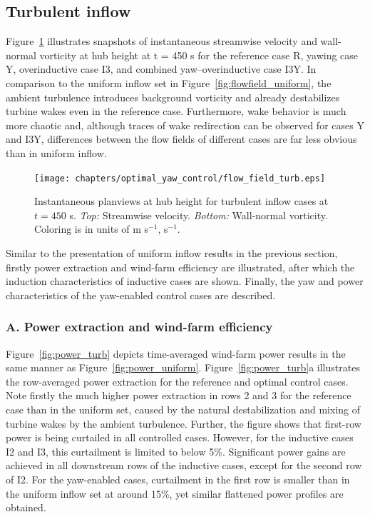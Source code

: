 \subsection{Turbulent inflow}\label{sec:opt_yaw_turb}
	Figure~\ref{fig:flowfield_turb} illustrates snapshots of instantaneous streamwise velocity and wall-normal vorticity at hub height at t = 450 s for the reference case R, yawing case Y, overinductive case I3, and combined yaw--overinductive case I3Y. In comparison to the uniform inflow set in Figure~\ref{fig:flowfield_uniform}, the ambient turbulence introduces background vorticity and already destabilizes turbine wakes even in the reference case. Furthermore, wake behavior is much more chaotic and, although traces of wake redirection can be observed for cases Y and I3Y, differences between the flow fields of different cases are far less obvious than in uniform inflow. 
	\begin{figure}
		\texttt{[image: chapters/optimal\_yaw\_control/flow\_field\_turb.eps]}
		\caption[Instantaneous planviews at hub height for turbulent inflow cases at $t= 450$ s.]{Instantaneous planviews at hub height for turbulent inflow cases at $t= 450$ s. \emph{Top: } Streamwise velocity. \emph{Bottom: } Wall-normal vorticity. Coloring is in units of m s$^{-1}$, s$^{-1}$. \label{fig:flowfield_turb}}
	\end{figure}
	
	Similar to the presentation of uniform inflow results in the previous section, firstly power extraction and wind-farm efficiency are illustrated, after which the induction characteristics of inductive cases are shown. Finally, the yaw and power characteristics of the yaw-enabled control cases are described.
	
	\subsubsection{A. Power extraction and wind-farm efficiency}
	Figure~\ref{fig:power_turb} depicts time-averaged wind-farm power results in the same manner as Figure~\ref{fig:power_uniform}. Figure~\ref{fig:power_turb}a illustrates the row-averaged power extraction for the reference and optimal control cases. Note firstly the much higher power extraction in rows 2 and 3 for the reference case than in the uniform set, caused by the natural destabilization and mixing of turbine wakes by the ambient turbulence. Further, the figure shows that first-row power is being curtailed in all controlled cases. However, for the inductive cases I2 and I3, this curtailment is limited to below 5\%. Significant power gains are achieved in all downstream rows of the inductive cases, except for the second row of I2. For the yaw-enabled cases, curtailment in the first row is smaller than in the uniform inflow set at around 15\%, yet similar flattened power profiles are obtained. 
	
